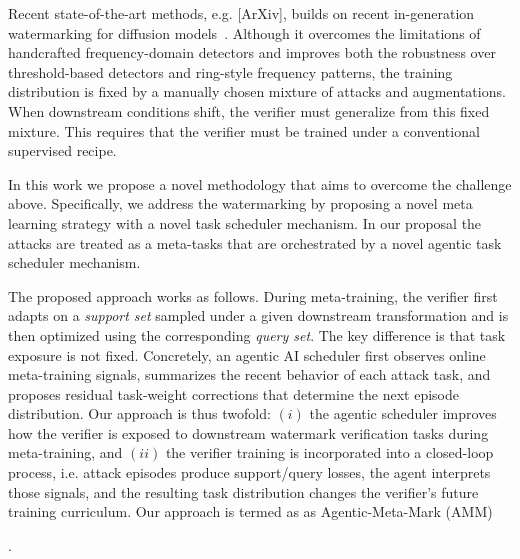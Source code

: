 

{\color{blue} Recent state-of-the-art methods, e.g. [ArXiv], builds on recent in-generation watermarking for diffusion models~\cite{wen2023tree_ring,fernandez2023stable,yang2024gaussian,huang2024robin}. Although it overcomes the limitations of handcrafted frequency-domain detectors and improves both the robustness over threshold-based detectors and ring-style frequency patterns, the training distribution is fixed by a manually chosen mixture of attacks and augmentations. When downstream conditions shift, the verifier must generalize from this fixed mixture. This requires that the verifier must be trained under a conventional supervised recipe.

In this work we propose a novel methodology that aims to overcome the challenge above. Specifically, we address the watermarking by proposing a novel meta learning strategy with a novel task scheduler mechanism. In our proposal the  attacks are treated as a meta-tasks that are orchestrated by a novel  agentic task scheduler mechanism. 

The proposed approach works as follows. During meta-training, the verifier first adapts on a {\it support set} sampled under a given downstream transformation and is then optimized using the corresponding {\it query set}. The key difference is that task exposure is not fixed. Concretely, an agentic AI scheduler first observes online meta-training signals,  summarizes the recent behavior of each attack task, and  proposes residual task-weight corrections that determine the next episode distribution. Our approach is thus twofold: $(i)$ the agentic scheduler improves how the verifier is exposed to downstream watermark verification tasks during meta-training, and $(ii)$ the verifier training is incorporated into a closed-loop process, i.e. attack episodes produce support/query losses, the agent interprets those signals, and the resulting task distribution changes the verifier's future training curriculum. Our approach is termed as as Agentic-Meta-Mark (AMM)}.


